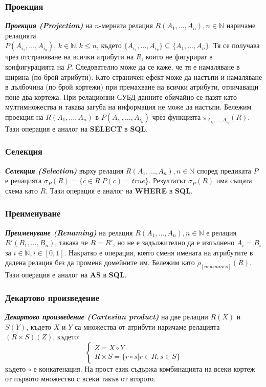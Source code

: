 \documentclass[fleqn,12pt]{article}
\begin{document}
\subsubsection{Проекция}
\textbf{\textit{Проекция (Projection)}} на $n$-мерната релация $R(A_1, \dots, A_n), n \in \mathbb{N}$ наричаме релацията \\
$P(A_{i_1}, \dots, A_{i_k})$, $k \in \mathbb{N}, k \leq n$, където $\{A_{i_1}, \dots, A_{i_k}\} \subseteq \{A_1, \dots, A_n\}$.
Тя се получава чрез отстраняване на всички атрибути на $R$, които не фигурират в конфигурацията на $P$.
Следователно може да се каже, че тя е намаляване в ширина (по брой атрибути).
Като страничен ефект може да настъпи и намаляване в дълбочина (по брой кортежи) при премахване на всички атрибути, отличаващи поне два кортежа.
При релационни СУБД данните обичайно се пазят като мултимножества и такава загуба на информация не може да настъпи.
\bigbreak
Бележим проекция на $R(A_1, \dots, A_n)$ в $P(A_{i_1}, \dots, A_{i_k})$ чрез функцията $\pi_{A_{i_1}, \dots, A_{i_k}}(R)$.
Тази операция е аналог на \textbf{SELECT} в \textbf{SQL}.

\subsubsection{Селекция}
\textbf{\textit{Селекция (Selection)}} върху релация $R(A_1, \dots, A_n), n \in \mathbb{N}$ според предиката $P$ е релацията $\sigma_{P}(R) = \{c \in R | P(c) = true\}$.
Резултатът $\sigma_{P}(R)$ има същата схема като $R$.
Тази операция е аналог на \textbf{WHERE} в \textbf{SQL}.

\subsubsection{Преименуване}
\textbf{\textit{Преименуване (Renaming)}} на релация $R(A_1, \dots, A_n), n \in \mathbb{N}$ е релация $R'(B_1, \dots, B_n)$, такава че $R = R'$, но не е задължително да е изпълнено $A_i = B_i$ за $i \in \mathbb{N}, i \in [0, 1]$. 
Накратко е операция, която сменя имената на атрибутите в дадена релация без да променя домейните им.
Бележим като $\rho_{[new names]}(R)$.
Тази операция е аналог на \textbf{AS} в \textbf{SQL}.

\subsubsection{Декартово произведение}
\textbf{\textit{Декартово произведение (Cartesian product)}} на две релации $R(X)$ и $S(Y)$, където $X$ и $Y$ са множества от атрибути наричаме релацията $(R \times S)(Z)$, където:
\begin{equation}
    \begin{cases}
        Z = X \circ Y\\
        R \times S = \{r \circ s | r \in R, s \in S\}
    \end{cases}
\end{equation}
където $\circ$ е конкатенация.
На прост език съдържа комбинацията на всеки кортеж от първото множество с всеки такъв от второто.
\end{document}
